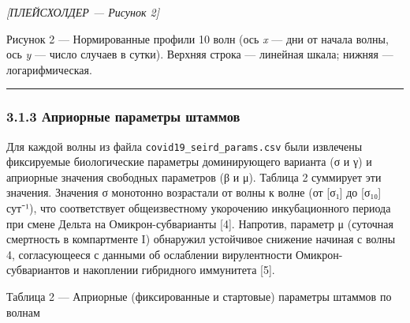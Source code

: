 \documentclass[12pt]{article}
\begin{document}
\emph{{[}ПЛЕЙСХОЛДЕР --- Рисунок 2{]}}

Рисунок 2 --- Нормированные профили 10 волн (ось \emph{x} --- дни от
начала волны, ось \emph{y} --- число случаев в сутки). Верхняя строка
--- линейная шкала; нижняя --- логарифмическая.

\begin{center}\rule{0.5\linewidth}{0.5pt}\end{center}

\subsubsection{3.1.3 Априорные параметры
штаммов}\label{ux430ux43fux440ux438ux43eux440ux43dux44bux435-ux43fux430ux440ux430ux43cux435ux442ux440ux44b-ux448ux442ux430ux43cux43cux43eux432}

Для каждой волны из файла \texttt{covid19\_seird\_params.csv} были
извлечены фиксируемые биологические параметры доминирующего варианта (σ
и γ) и априорные значения свободных параметров (β и μ). Таблица 2
суммирует эти значения. Значения σ монотонно возрастали от волны к волне
(от {[}σ₁{]} до {[}σ₁₀{]} сут⁻¹), что соответствует общеизвестному
укорочению инкубационного периода при смене Дельта на
Омикрон-субварианты {[}4{]}. Напротив, параметр μ (суточная смертность в
компартменте I) обнаружил устойчивое снижение начиная с волны 4,
согласующееся с данными об ослаблении вирулентности Омикрон-субвариантов
и накоплении гибридного иммунитета {[}5{]}.

Таблица 2 --- Априорные (фиксированные и стартовые) параметры штаммов по
волнам
\end{document}
